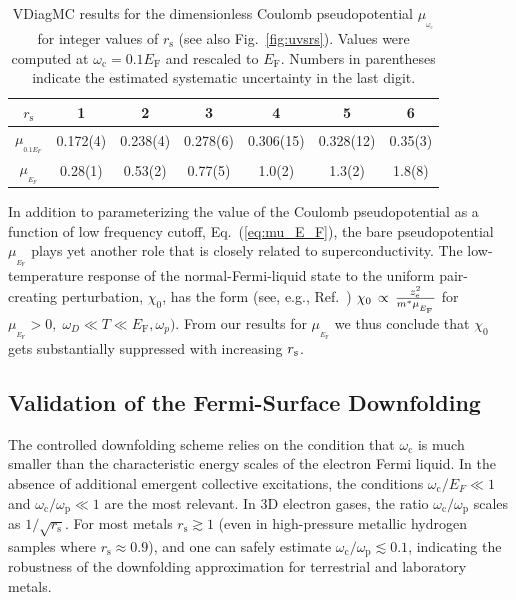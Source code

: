 \documentclass[%
 reprint,
superscriptaddress,
 amsmath,amssymb,
 aps,
prx,
]{revtex4-2}
\newcommand{\txc}{\text{c}}
\newcommand{\txp}{\text{p}}
\newcommand{\txs}{\text{s}}
\newcommand{\txF}{\text{F}}
\begin{document}
\begin{table}[b] %
    \begin{ruledtabular} %
    \begin{tabular}{ccccccc}
    $r_\txs$ & 1 & 2 & 3 & 4 & 5 & 6 \\
    \hline
    $\mu_{_{0.1E_F}}$ & 0.172(4) & 0.238(4) & 0.278(6) & 0.306(15) & 0.328(12) & 0.35(3) \\
    \hline
    $\mu_{_{E_F}}$ & 0.28(1) & 0.53(2) & 0.77(5) & 1.0(2) & 1.3(2) & 1.8(8) \\
    \end{tabular}
    \end{ruledtabular}
    \caption{
    VDiagMC results for the dimensionless Coulomb pseudopotential $\mu_{_{\omega_\txc}}$ for integer values of $r_\txs$ (see also Fig.~\ref{fig:uvsrs}). Values were computed at $\omega_\txc=0.1E_\txF$ and rescaled to $E_\txF$. Numbers in parentheses indicate the estimated systematic uncertainty in the last digit.
    }
    \label{tab:vdiagmc_data}
\end{table}

In addition to parameterizing the value of the Coulomb pseudopotential as a function of low frequency cutoff, Eq.~(\ref{eq:mu_E_F}), the bare pseudopotential $\mu_{_{E_\txF}}$ plays yet another role that is closely related to superconductivity. The low-temperature response of the normal-Fermi-liquid state to the uniform pair-creating perturbation, $\chi_0$, has the form (see, e.g., Ref.~\cite{pengcheng})
$\chi_0 \, \propto\, {z_{\rm e}^2\over m^*\mu_{_{E_\txF}}} $ for $\mu_{_{E_\txF}} >0, \; \omega_D \ll T \ll E_\txF, \omega_p).$
From our results for $\mu_{_{E_\txF}}$ we thus conclude that $\chi_0$ gets substantially suppressed with increasing $r_{\rm s}$.




\subsection{Validation of the Fermi-Surface Downfolding}
\label{sec:validation}
The controlled downfolding scheme relies on the condition that $\omega_\txc$ is much smaller than the characteristic energy scales of the electron Fermi liquid. In the absence of additional emergent collective excitations, the conditions $\omega_\txc/E_F \ll 1$ and $\omega_\txc/\omega_\txp \ll 1$ are the most relevant. In 3D electron gases, the ratio $\omega_\txc/\omega_\txp$ scales as $1/\sqrt{r_\txs}$. For most metals $r_\txs \gtrsim 1$ (even in high-pressure metallic hydrogen samples where $r_\txs \approx 0.9$), and one can safely estimate $\omega_\txc/\omega_\txp \lesssim 0.1$, indicating the robustness of the downfolding approximation for terrestrial and laboratory metals.
\end{document}
